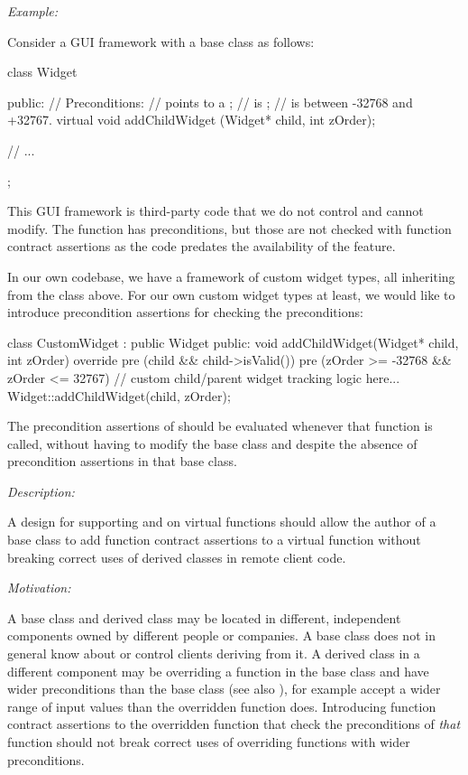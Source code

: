 \emph{Example:}

Consider a GUI framework with a  base class as follows:

\begin{codeblock}
class Widget {
public:
  // Preconditions:   
  // \phantom{xxx} points to a ;
  // \phantom{xxx} is ; 
  // \phantom{xxx} is between -32768 and +32767.
  virtual void addChildWidget (Widget* child, int zOrder);
  
// ...
};
\end{codeblock}
This GUI framework is third-party code that we do not control and cannot modify. The function \allowbreak{} has preconditions, but those are not checked with function contract assertions as the code predates the availability of the feature.

In our own codebase, we have a framework of custom widget types, all inheriting from the  class above. For our own custom widget types at least, we would like to introduce precondition assertions for checking the preconditions:
\begin{codeblock}
class CustomWidget : public Widget {
public:
  void addChildWidget(Widget* child, int zOrder) override
    pre (child && child->isValid())
    pre (zOrder >= -32768 && zOrder <= 32767) 
  {
    // custom child/parent widget tracking logic here...
    Widget::addChildWidget(child, zOrder);
  }
}
\end{codeblock}

The precondition assertions of \allowbreak{} should be evaluated whenever that function is called, without having to modify the  base class and despite the absence of precondition assertions in that base class.


\emph{Description:}

A design for supporting  and  on virtual functions should allow the author of a base class to add function contract assertions to a virtual function without breaking correct uses of derived classes in remote client code.

\emph{Motivation:}

A base class and derived class may be located in different, independent components owned by different people or companies. A base class does not in general know about or control clients deriving from it. A derived class in a different component may be overriding a function in the base class and have wider preconditions than the base class (see also ), for example accept a wider range of input values than the overridden function does. Introducing function contract assertions to the overridden function that check the preconditions of \emph{that} function should not break correct uses of overriding functions with wider preconditions.

